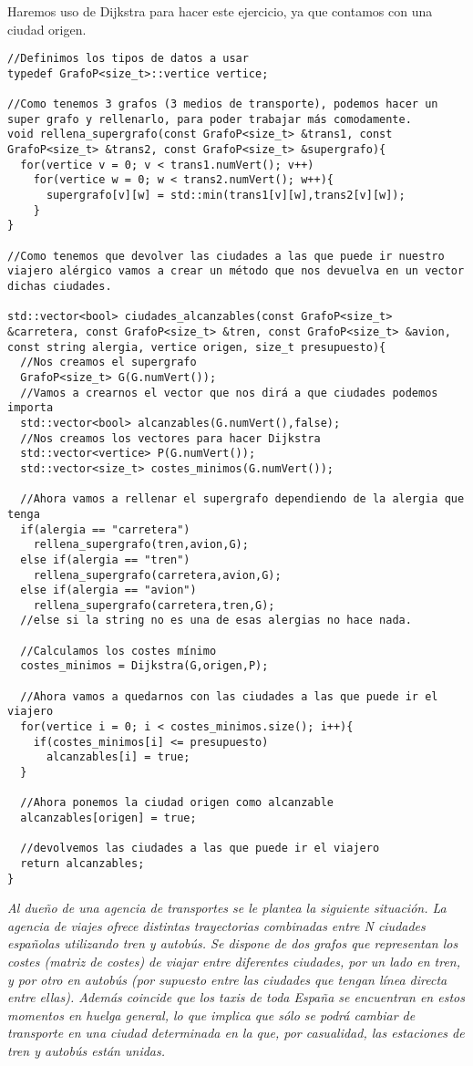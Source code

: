 Haremos uso de Dijkstra para hacer este ejercicio, ya que contamos con una ciudad origen.
\begin{verbatim}
//Definimos los tipos de datos a usar
typedef GrafoP<size_t>::vertice vertice;

//Como tenemos 3 grafos (3 medios de transporte), podemos hacer un super grafo y rellenarlo, para poder trabajar más comodamente.
void rellena_supergrafo(const GrafoP<size_t> &trans1, const GrafoP<size_t> &trans2, const GrafoP<size_t> &supergrafo){
  for(vertice v = 0; v < trans1.numVert(); v++)
    for(vertice w = 0; w < trans2.numVert(); w++){
      supergrafo[v][w] = std::min(trans1[v][w],trans2[v][w]);
    }
}

//Como tenemos que devolver las ciudades a las que puede ir nuestro viajero alérgico vamos a crear un método que nos devuelva en un vector dichas ciudades.

std::vector<bool> ciudades_alcanzables(const GrafoP<size_t> &carretera, const GrafoP<size_t> &tren, const GrafoP<size_t> &avion, const string alergia, vertice origen, size_t presupuesto){
  //Nos creamos el supergrafo
  GrafoP<size_t> G(G.numVert());
  //Vamos a crearnos el vector que nos dirá a que ciudades podemos importa
  std::vector<bool> alcanzables(G.numVert(),false);
  //Nos creamos los vectores para hacer Dijkstra
  std::vector<vertice> P(G.numVert());
  std::vector<size_t> costes_minimos(G.numVert());

  //Ahora vamos a rellenar el supergrafo dependiendo de la alergia que tenga
  if(alergia == "carretera")
    rellena_supergrafo(tren,avion,G);
  else if(alergia == "tren")
    rellena_supergrafo(carretera,avion,G);
  else if(alergia == "avion")
    rellena_supergrafo(carretera,tren,G);
  //else si la string no es una de esas alergias no hace nada.

  //Calculamos los costes mínimo
  costes_minimos = Dijkstra(G,origen,P);

  //Ahora vamos a quedarnos con las ciudades a las que puede ir el viajero
  for(vertice i = 0; i < costes_minimos.size(); i++){
    if(costes_minimos[i] <= presupuesto)
      alcanzables[i] = true;
  }

  //Ahora ponemos la ciudad origen como alcanzable
  alcanzables[origen] = true;

  //devolvemos las ciudades a las que puede ir el viajero
  return alcanzables;
}
\end{verbatim}

\textbf{\large{}}\textit{ Al dueño de una agencia de transportes se le plantea la siguiente situación. La agencia de viajes ofrece distintas trayectorias combinadas entre N ciudades españolas utilizando tren y autobús. Se dispone de dos grafos que representan los costes (matriz de costes) de viajar entre diferentes ciudades, por un lado en tren, y por otro en autobús (por supuesto entre las ciudades que tengan línea directa entre ellas). Además coincide que los taxis de toda España se encuentran en estos momentos en huelga general, lo que implica que sólo se podrá cambiar de transporte en una ciudad determinada en la que, por casualidad, las estaciones de tren y autobús están unidas.}

